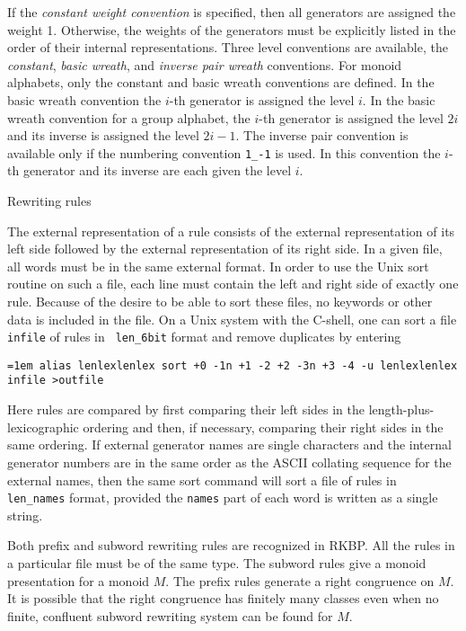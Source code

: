 If the {\it constant weight convention} is specified, then all
generators are assigned the weight 1.  Otherwise, the weights of the
generators must be explicitly listed in the order of their internal
representations.  Three level conventions are available, the {\it
constant}, {\it basic wreath}, and {\it inverse pair wreath}
conventions.  For monoid alphabets, only the constant and basic wreath
conventions are defined.  In the basic wreath convention the $i$-th
generator is assigned the level $i$.  In the basic wreath convention
for a group alphabet, the $i$-th generator is assigned the level $2i$
and its inverse is assigned the level $2i-1$.  The inverse pair
convention is available only if the numbering convention {\tt 1\_-1}
is used.  In this convention the $i$-th generator and its inverse are
each given the level $i$.

\bigskip
{}  Rewriting rules

\nobreak

The external representation of a rule consists of the external
representation of its left side followed by the external
representation of its right side. In a given file, all words must be
in the same external format. In order to use the Unix sort routine on
such a file, each line must contain the left and right side of exactly
one rule. Because of the desire to be able to sort these files, no
keywords or other data is included in the file. On a Unix system with
the C-shell, one can sort a file {\tt infile} of rules in {\tt
len\_6bit} format and remove duplicates by entering

\bigskip
\vbox{\tt \obeylines \obeyspaces \parindent=1em
alias lenlexlenlex sort +0 -1n +1 -2 +2 -3n +3 -4 -u
lenlexlenlex infile >outfile
}
\bigskip

Here rules are compared by first comparing their left sides in the
length-plus-lexico\-graphic ordering and then, if necessary, comparing
their right sides in the same ordering.  If external generator names
are single characters and the internal generator numbers are in the
same order as the ASCII collating sequence for the external names,
then the same sort command will sort a file of rules in {\tt
len\_names} format, provided the {\tt names} part of each word is
written as a single string.

Both prefix and subword rewriting rules are recognized in RKBP.  All
the rules in a particular file must be of the same type.  The subword
rules give a monoid presentation for a monoid $M$. The prefix rules
generate a right congruence on $M$. It is possible that the right
congruence has finitely many classes even when no finite, confluent
subword rewriting system can be found for $M$.


